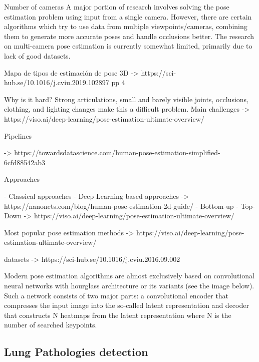 Number of cameras
A major portion of research involves solving the pose estimation problem using input from a single camera. However, there are certain algorithms which try to use data from multiple viewpoints/cameras, combining them to generate more accurate poses and handle occlusions better. The research on multi-camera pose estimation is currently somewhat limited, primarily due to lack of good datasets.

Mapa de tipos de estimación de pose 3D
-> https://sci-hub.se/10.1016/j.cviu.2019.102897 pp 4

Why is it hard?
Strong articulations, small and barely visible joints, occlusions, clothing, and lighting changes make this a difficult problem.
Main challenges -> https://viso.ai/deep-learning/pose-estimation-ultimate-overview/

Pipelines

-> https://towardsdatascience.com/human-pose-estimation-simplified-6cfd88542ab3

Approaches

- Classical approaches
- Deep Learning based approaches
-> https://nanonets.com/blog/human-pose-estimation-2d-guide/
- Bottom-up
- Top-Down
-> https://viso.ai/deep-learning/pose-estimation-ultimate-overview/


Most popular pose estimation methods
-> https://viso.ai/deep-learning/pose-estimation-ultimate-overview/


datasets
-> https://sci-hub.se/10.1016/j.cviu.2016.09.002

Modern pose estimation algorithms are almost exclusively based on convolutional neural networks with hourglass architecture or its variants (see the image below). Such a network consists of two major parts: a convolutional encoder that compresses the input image into the so-called latent representation and decoder that constructs N heatmaps from the latent representation where N is the number of searched keypoints.




\subsection{Lung Pathologies detection}
